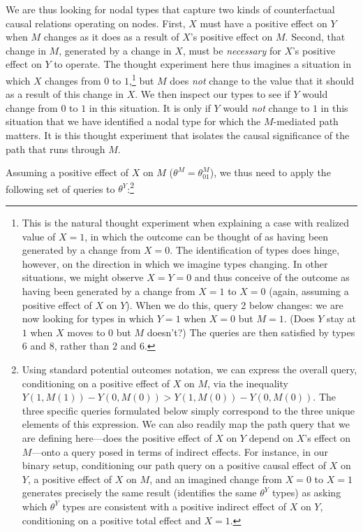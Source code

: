 \documentclass[
  12pt,
]{book}
\begin{document}
We are thus looking for nodal types that capture two kinds of counterfactual causal relations operating on nodes. First, \(X\) must have a positive effect on \(Y\) when \(M\) changes as it does as a result of \(X\)'s positive effect on \(M\). Second, that change in \(M\), generated by a change in \(X\), must be \emph{necessary} for \(X\)'s positive effect on \(Y\) to operate. The thought experiment here thus imagines a situation in which \(X\) changes from \(0\) to \(1\),\footnote{This is the natural thought experiment when explaining a case with realized value of \(X=1\), in which the outcome can be thought of as having been generated by a change from \(X=0\). The identification of types does hinge, however, on the direction in which we imagine types changing. In other situations, we might observe \(X=Y=0\) and thus conceive of the outcome as having been generated by a change from \(X=1\) to \(X=0\) (again, assuming a positive effect of \(X\) on \(Y\)). When we do this, query 2 below changes: we are now looking for types in which \(Y=1\) when \(X=0\) but \(M=1\). (Does \(Y\) stay at \(1\) when \(X\) moves to \(0\) but \(M\) doesn't?) The queries are then satisfied by types \(6\) and \(8\), rather than \(2\) and \(6\).} but \(M\) does \emph{not} change to the value that it should as a result of this change in \(X\). We then inspect our types to see if \(Y\) would change from \(0\) to \(1\) in this situation. It is only if \(Y\) would \emph{not} change to \(1\) in this situation that we have identified a nodal type for which the \(M\)-mediated path matters. It is this thought experiment that isolates the causal significance of the path that runs through \(M\).

Assuming a positive effect of \(X\) on \(M\) (\(\theta^M=\theta^M_{01}\)), we thus need to apply the following set of queries to \(\theta^Y\):\footnote{Using standard potential outcomes notation, we can express the overall query, conditioning on a positive effect of \(X\) on \(M\), via the inequality \(Y(1, M(1)) - Y(0, M(0)) > Y(1, M(0)) - Y(0, M(0))\). The three specific queries formulated below simply correspond to the three unique elements of this expression. We can also readily map the path query that we are defining here---does the positive effect of \(X\) on \(Y\) depend on \(X\)'s effect on \(M\)---onto a query posed in terms of indirect effects. For instance, in our binary setup, conditioning our path query on a positive causal effect of \(X\) on \(Y\), a positive effect of \(X\) on \(M\), and an imagined change from \(X=0\) to \(X=1\) generates precisely the same result (identifies the same \(\theta^Y\) types) as asking which \(\theta^Y\) types are consistent with a positive indirect effect of \(X\) on \(Y\), conditioning on a positive total effect and \(X=1\).}
\end{document}
